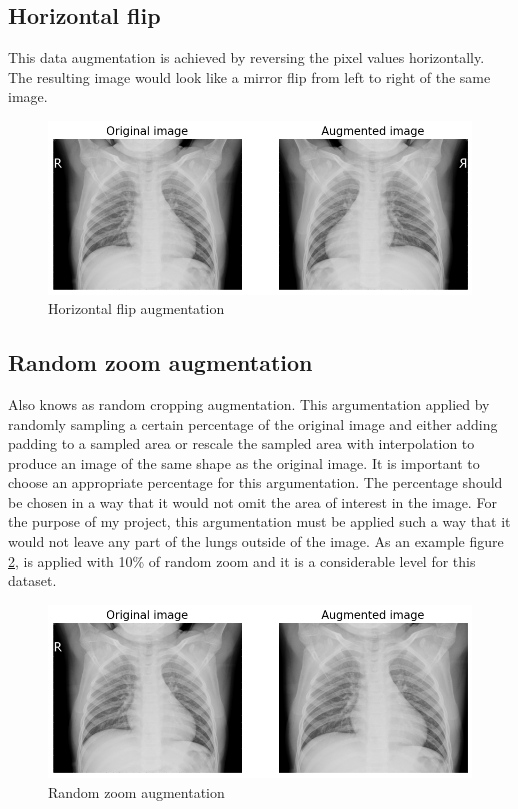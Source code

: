 \subsection{Horizontal flip} \label{subsec:horizontalflip}
This data augmentation is achieved by reversing the pixel values horizontally.
The resulting image would look like a mirror flip from left to right of the same image.

\begin{figure}[H]
    \centering
    \includegraphics[width=\textwidth]{img/augmented-image-1588951788.png}
    \caption{Horizontal flip augmentation}
    \label{fig:horizontalflipxray}
\end{figure}

\subsection{Random zoom augmentation} \label{subsec:randomzoom}
Also knows as random cropping augmentation.
This argumentation applied by randomly sampling a certain percentage of the original image and either adding padding to a sampled area or rescale the sampled area with interpolation to produce an image of the same shape as the original image.
It is important to choose an appropriate percentage for this argumentation.
The percentage should be chosen in a way that it would not omit the area of interest in the image.
For the purpose of my project, this argumentation must be applied such a way that it would not leave any part of the lungs outside of the image. 
As an example figure \ref{fig:randomzoomxray}, is applied with 10\% of random zoom and it is a considerable level for this dataset.

\begin{figure}[H]
    \centering
    \includegraphics[width=\textwidth]{img/augmented-image-1588951794.png}
    \caption{Random zoom augmentation}
    \label{fig:randomzoomxray}
\end{figure}

